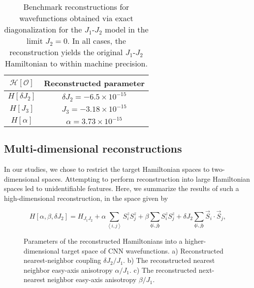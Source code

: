 \documentclass[amsmath,amssymb,aps,prb,superscriptaddress,onecolumn,floatfix]{revtex4}
\begin{document}
\begin{table}[ht]
\centering
\begin{tabular}{ |c||c| }

 \hline
 $\mathcal{H}[\mathcal{O}]$ & Reconstructed parameter \\
 \hline
 $H[\delta J_2]$  & $\delta J_2 = -6.5 \times 10^{-15} $ \\
 $H[J_3]$  & $J_3 = -3.18 \times 10^{-15} $ \\
 $H[\alpha]$ & $\alpha = 3.73 \times 10^{-15} $ \\
 \hline
\end{tabular}

\caption{Benchmark reconstructions for wavefunctions obtained via exact diagonalization for the $J_1$-$J_2$ model in the limit $J_2 = 0$.
In all cases, the reconstruction yields the original $J_1$-$J_2$ Hamiltonian to within machine precision.}
\label{tab:table}
\end{table}


\subsection{Multi-dimensional reconstructions}

In our studies, we chose to restrict the target Hamiltonian spaces to two-dimensional spaces.
Attempting to perform reconstruction into large Hamiltonian spaces led to unidentifiable features.
Here, we summarize the results of such a high-dimensional reconstruction, in the space given by

\begin{equation}
     H[\alpha, \beta, \delta J_2] = H_{J_1J_2} + \alpha \sum_{\left< i, j\right>} S^z_i S^z_{j} + \beta \sum_{\llangle i, j\rrangle} S^z_i S^z_{j} + \delta J_2 \sum_{\llangle i, j\rrangle} \vec{S}_i \cdot \vec{S}_j,
\end{equation}

\begin{figure*}[htp]
    \caption{Parameters of the reconstructed Hamiltonians into a higher-dimensional target space of CNN wavefunctions.
    a) Reconstructed nearest-neighbor coupling $\delta J_2/J_1$.
    b) The reconstructed nearest neighbor easy-axis anisotropy $\alpha/J_1$.
    c) The reconstructed next-nearest neighbor easy-axis anisotropy $\beta/J_1$.}
    \label{fig:H1}
\end{figure*}
\end{document}
